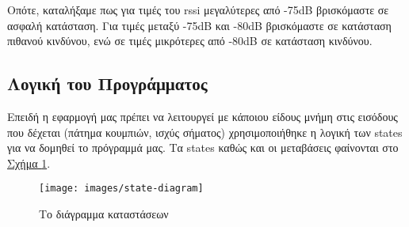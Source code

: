 Οπότε, καταλήξαμε πως για τιμές του rssi μεγαλύτερες από -75dB βρισκόμαστε σε
ασφαλή κατάσταση.
Για τιμές μεταξύ -75dB και -80dB βρισκόμαστε σε κατάσταση πιθανού
κινδύνου, ενώ σε τιμές μικρότερες από -80dB σε κατάσταση κινδύνου.

\subsection{Λογική του Προγράμματος}
Επειδή η εφαρμογή μας πρέπει να λειτουργεί με κάποιου είδους μνήμη στις εισόδους που δέχεται (πάτημα κουμπιών, ισχύς σήματος) χρησιμοποιήθηκε η λογική των states για να δομηθεί το πρόγραμμά μας.
Τα states καθώς και οι μεταβάσεις φαίνονται στο
\renewcommand{\figurename}{Σχήμα}
\hyperref[fig:stdiag]{\figurename{} \ref{fig:stdiag}}.
\begin{figure}[htb]
    \centering
    \texttt{[image: images/state-diagram]}
    \caption{Το διάγραμμα καταστάσεων}
    \label{fig:stdiag}
\end{figure}
